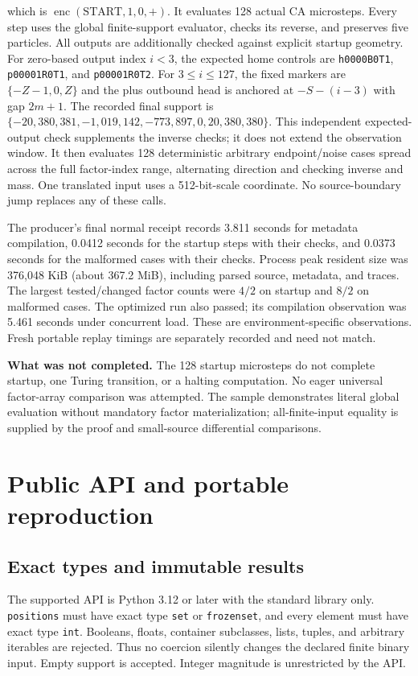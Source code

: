 \documentclass[11pt,a4paper]{article}
\numberwithin{equation}{section}
\begin{document}
which is $\operatorname{enc}(\mathrm{START},1,0,+)$. It evaluates 128 actual CA microsteps. Every step uses the global finite-support evaluator, checks its reverse, and preserves five particles. All outputs are additionally checked against explicit startup geometry. For zero-based output index $i<3$, the expected home controls are \texttt{h0000B0T1}, \texttt{p00001R0T1}, and \texttt{p00001R0T2}. For $3\leq i\leq127$, the fixed markers are $\{-Z-1,0,Z\}$ and the plus outbound head is anchored at $-S-(i-3)$ with gap $2m+1$. The recorded final support is $\{-20{,}380{,}381,-1{,}019{,}142,-773{,}897,0,20{,}380{,}380\}$. This independent expected-output check supplements the inverse checks; it does not extend the observation window. It then evaluates 128 deterministic arbitrary endpoint/noise cases spread across the full factor-index range, alternating direction and checking inverse and mass. One translated input uses a 512-bit-scale coordinate. No source-boundary jump replaces any of these calls.

The producer's final normal receipt records 3.811 seconds for metadata compilation, 0.0412 seconds for the startup steps with their checks, and 0.0373 seconds for the malformed cases with their checks. Process peak resident size was 376,048 KiB (about 367.2 MiB), including parsed source, metadata, and traces. The largest tested/changed factor counts were $4/2$ on startup and $8/2$ on malformed cases. The optimized run also passed; its compilation observation was 5.461 seconds under concurrent load. These are environment-specific observations. Fresh portable replay timings are separately recorded and need not match.

\textbf{What was not completed.} The 128 startup microsteps do not complete startup, one Turing transition, or a halting computation. No eager universal factor-array comparison was attempted. The sample demonstrates literal global evaluation without mandatory factor materialization; all-finite-input equality is supplied by the proof and small-source differential comparisons.

\section{Public API and portable reproduction}\label{fpa:lz:sec:replay}
\subsection{Exact types and immutable results}
The supported API is Python 3.12 or later with the standard library only. \texttt{positions} must have exact type \texttt{set} or \texttt{frozenset}, and every element must have exact type \texttt{int}. Booleans, floats, container subclasses, lists, tuples, and arbitrary iterables are rejected. Thus no coercion silently changes the declared finite binary input. Empty support is accepted. Integer magnitude is unrestricted by the API.
\end{document}
